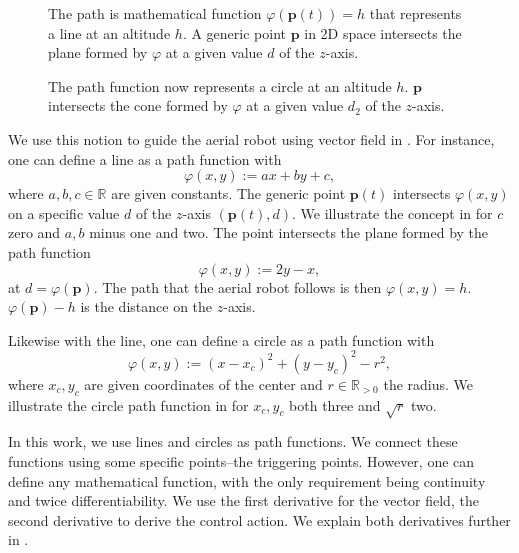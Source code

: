 \begin{figure}[t!]
  \centering
  
  \caption[Concept of a line as a path function]{The path is mathematical function $\varphi(\mathbf{p}(t))=h$ that represents a line at an altitude $h$. A generic point $\mathbf{p}$ in 2D space intersects the plane formed by $\varphi$ at a given value $d$ of the $z$-axis.}
  \label{fig:plot1}
\end{figure}

\begin{figure}[t!]
  \centering
  
  \caption[Concept of a circle as a path function]{The path function now represents a circle at an altitude $h$. $\mathbf{p}$ intersects the cone formed by $\varphi$ at a given value $d_2$ of the $z$-axis.}
  \label{fig:plot11}
\end{figure}

We use this notion to guide the aerial robot using vector field in . For instance, one can define a line as a path function with
\begin{equation}\label{eq:basic-path}
  \varphi(x,y):=ax+by+c,
\end{equation}
where $a,b,c\in\mathbb{R}$ are given constants. The generic point $\mathbf{p}(t)$ intersects $\varphi(x,y)$ on a specific value $d$ of the $z$-axis $(\mathbf{p}(t),d)$. We illustrate the concept in  for $c$ zero and $a,b$ minus one and two. The point intersects the plane formed by the path function
\begin{equation}\label{eq:pathf-line}
  \varphi(x,y):=2y-x,
\end{equation}
at $d=\varphi(\mathbf{p})$. The path that the aerial robot follows is then $\varphi(x,y)=h$. $\varphi(\mathbf{p})-h$ is the distance on the $z$-axis.

Likewise with the line, one can define a circle as a path function with
\begin{equation}\label{eq:pathf-circle}
  \varphi(x,y):=(x-x_c)^2+(y-y_c)^2-r^2,
\end{equation}
where $x_c,y_c$ are given coordinates of the center and $r\in\mathbb{R}_{>0}$ the radius. We illustrate the circle path function in  for $x_c,y_c$ both three and $\sqrt{r}$ two. 

In this work, we use lines and circles as path functions. We connect these functions using some specific points--the triggering points. However, one can define any mathematical function, with the only requirement being continuity and twice differentiability. We use the first derivative for the vector field, the second derivative to derive the control action. We explain both derivatives further in .


